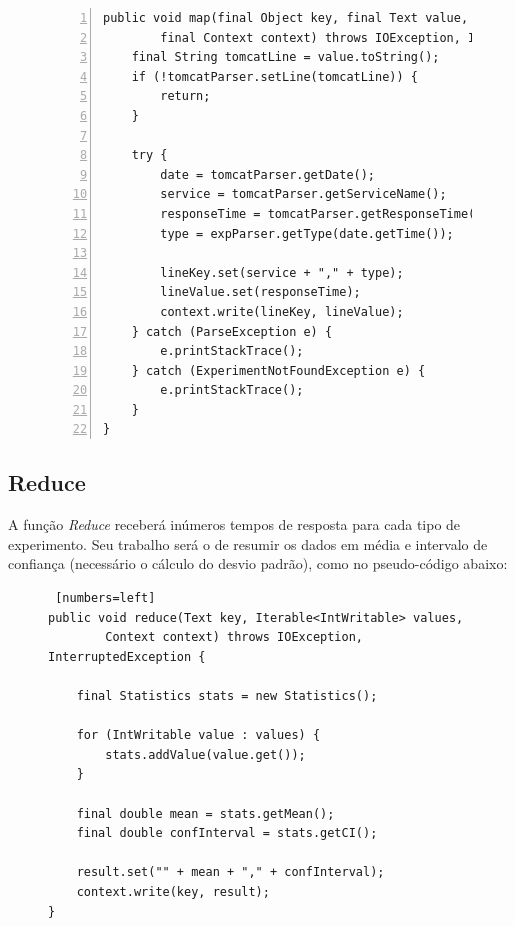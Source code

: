 \documentclass[brazil, a4paper,12pt]{article}
\begin{document}
\begin{figure} [!htb]
\begin{center}
\footnotesize
\begin{lstlisting}[numbers=left]
public void map(final Object key, final Text value,
		final Context context) throws IOException, InterruptedException {
	final String tomcatLine = value.toString();
	if (!tomcatParser.setLine(tomcatLine)) {
		return;
	}

	try {
		date = tomcatParser.getDate();
		service = tomcatParser.getServiceName();
		responseTime = tomcatParser.getResponseTime();
		type = expParser.getType(date.getTime());

		lineKey.set(service + "," + type);
		lineValue.set(responseTime);
		context.write(lineKey, lineValue);
	} catch (ParseException e) {
		e.printStackTrace();
	} catch (ExperimentNotFoundException e) {
		e.printStackTrace();
	}
}
\end{lstlisting}
\end{center}
\end{figure}


\subsection{Reduce}
A função \emph{Reduce} receberá inúmeros tempos de resposta para cada tipo de experimento. Seu trabalho será o de resumir os dados em média e intervalo de confiança (necessário o cálculo do desvio padrão), como no pseudo-código abaixo:

\begin{figure} [!htb]
\begin{center}
\footnotesize
\begin{lstlisting} [numbers=left]
public void reduce(Text key, Iterable<IntWritable> values,
		Context context) throws IOException, InterruptedException {

	final Statistics stats = new Statistics();

	for (IntWritable value : values) {
		stats.addValue(value.get());
	}

	final double mean = stats.getMean();
	final double confInterval = stats.getCI();

	result.set("" + mean + "," + confInterval);
	context.write(key, result);
}
\end{lstlisting}
\end{center}
\end{figure}
\end{document}
